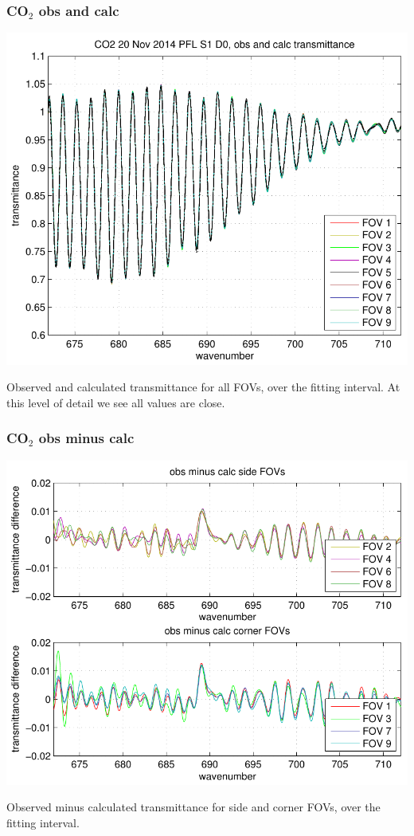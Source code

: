 \documentclass[11pt]{beamer}
\begin{document}
\begin{frame}
\frametitle{CO$_2$ obs and calc}

\begin{center}
  \includegraphics[scale=0.54]{figures/CO2_obs_and_calc.pdf}
\end{center}

Observed and calculated transmittance for all FOVs, over the fitting
interval.  At this level of detail we see all values are close.

\end{frame}
\begin{frame}
\frametitle{CO$_2$ obs minus calc}

\begin{center}
  \includegraphics[scale=0.54]{figures/CO2_breakout_2.pdf}
\end{center}

Observed minus calculated transmittance for side and corner FOVs,
over the fitting interval.

\end{frame}
\end{document}
